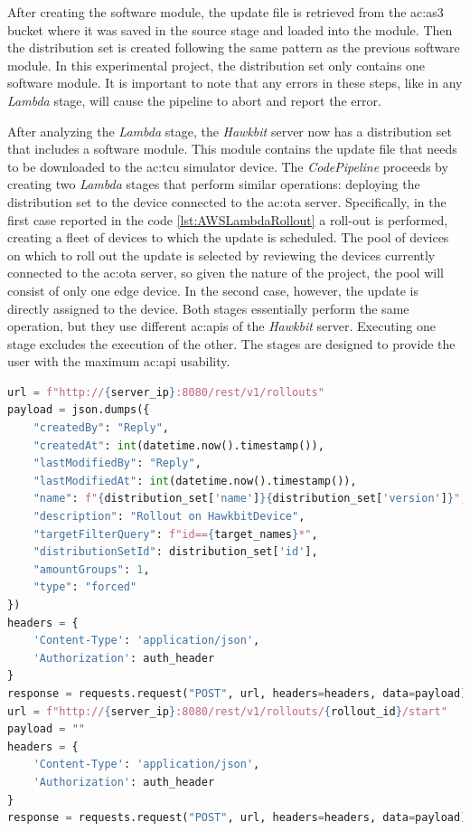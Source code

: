 After creating the software module, the update file is retrieved from the \gls{ac:as3} bucket where it was saved in the source stage and loaded into the module. Then the distribution set is created following the same pattern as the previous software module. In this experimental project, the distribution set only contains one software module. It is important to note that any errors in these steps, like in any \textit{Lambda} stage, will cause the pipeline to abort and report the error.

After analyzing the \textit{Lambda} stage, the \textit{Hawkbit} server now has a distribution set that includes a software module. This module contains the update file that needs to be downloaded to the \gls{ac:tcu} simulator device. The \textit{CodePipeline} proceeds by creating two \textit{Lambda} stages that perform similar operations: deploying the distribution set to the device connected to the \gls{ac:ota} server. Specifically, in the first case reported in the code \ref{lst:AWSLambdaRollout} a roll-out is performed, creating a fleet of devices to which the update is scheduled. The pool of devices on which to roll out the update is selected by reviewing the devices currently connected to the \gls{ac:ota} server, so given the nature of the project, the pool will consist of only one edge device. In the second case, however, the update is directly assigned to the device. Both stages essentially perform the same operation, but they use different \gls{ac:api}s of the \textit{Hawkbit} server. Executing one stage excludes the execution of the other. The stages are designed to provide the user with the maximum \gls{ac:api} usability. 
\begin{lstlisting}[language=Python, caption={\textit{Lambda} code for the roll out creation and execution}, label=lst:AWSLambdaRollout]
url = f"http://{server_ip}:8080/rest/v1/rollouts"
payload = json.dumps({
    "createdBy": "Reply",
    "createdAt": int(datetime.now().timestamp()),
    "lastModifiedBy": "Reply",
    "lastModifiedAt": int(datetime.now().timestamp()),
    "name": f"{distribution_set['name']}{distribution_set['version']}",
    "description": "Rollout on HawkbitDevice",
    "targetFilterQuery": f"id=={target_names}*",
    "distributionSetId": distribution_set['id'],
    "amountGroups": 1,
    "type": "forced"
})
headers = {
    'Content-Type': 'application/json',
    'Authorization': auth_header
}
response = requests.request("POST", url, headers=headers, data=payload)
url = f"http://{server_ip}:8080/rest/v1/rollouts/{rollout_id}/start"
payload = ""
headers = {
    'Content-Type': 'application/json',
    'Authorization': auth_header
}
response = requests.request("POST", url, headers=headers, data=payload)
\end{lstlisting}

